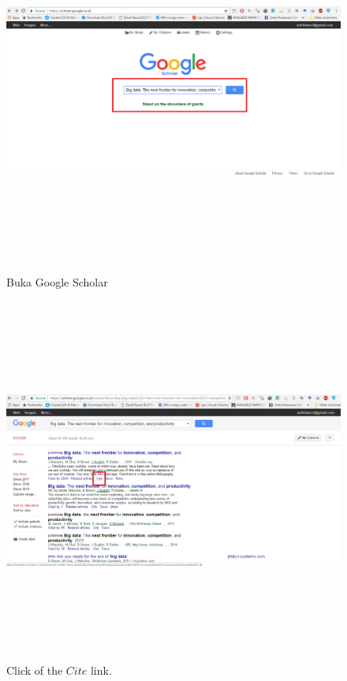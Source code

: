 \documentclass[preprint]{elsarticle}
\begin{document}
\begin{figure}[H]
\centering
\includegraphics[width=120mm, height=120mm, keepaspectratio]{get_bib_script_part_1}
\caption{Buka Google Scholar}
\label{fig:fig3_1}
\end{figure}

\begin{figure}[H]
\centering
\includegraphics[width=120mm, height=120mm, keepaspectratio]{get_bib_script_part_2}
\caption{Click of the $Cite$ link.}
\label{fig:fig3_2}
\end{figure}
\end{document}
